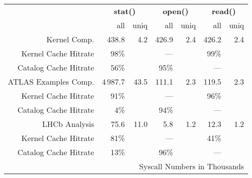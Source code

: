 

\begin{tabular}{|r|rrrrrr|}\hline
	\multirow{2}{*}{\backslashbox{\bf Benchmark}{\bf Syscall}} & \multicolumn{2}{c}{\bf stat()} &  \multicolumn{2}{c}{\bf open()} &  \multicolumn{2}{c|}{\bf read()}  \\
	 & \centering all & \centering uniq & \centering all & \centering uniq & \centering all & {\centering uniq} \\\hline
	 Kernel Comp. & 438.8 & 4.2 & 426.9 & 2.4 & 426.2 & 2.4  \\
	 Kernel Cache Hitrate & 98\% & & --- & & 99\% & \\
	 Catalog Cache Hitrate & 56\% & & 95\% & & --- & \\\hline
	 ATLAS Examples Comp. & 4\,987.7 & 43.5 & 111.1 & 2.3 & 119.5 & 2.3 \\
	 Kernel Cache Hitrate & 91\% & & --- & & 96\% & \\
	 Catalog Cache Hitrate &4\% & & 94\% & & --- & \\\hline
	 LHCb Analysis & 75.6 & 11.0 & 5.8 & 1.2 & 12.3 & 1.2 \\
 	 Kernel Cache Hitrate & 81\% & & --- & & 41\% & \\
	 Catalog Cache Hitrate & 13\% & & 96\% & &--- & \\\hline
	 \multicolumn{7}{r}{Syscall Numbers in Thousands}
\end{tabular}
